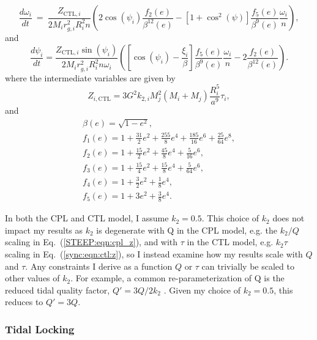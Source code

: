\begin{equation}\label{sync:eqn:ctl:omega}
  \frac{d\omega_i}{dt} \ = \ \frac{Z_{\mathrm{CTL},i}}{2 M_i r_{g,i}^2 
R_i^2 n} \left( 2 \cos(\psi_i) \frac{f_2(e)}{\beta^{12}(e)} - \left[ 1+\cos^2(\psi)
 \right] \frac{f_5(e)}{\beta^9(e)} 
\frac{\omega_i}{n} \right),  
\end{equation}
and
\begin{equation}\label{sync:eqn:ctl:psi}
  \frac{d\psi_i}{dt} = \frac{Z_{\mathrm{CTL},i} \sin(\psi_i)}{2 M_i r_{g,i}^2 R_i^2 n \omega_i}\left( \left[ \cos(\psi_i) - \frac{\xi_i}{ \beta} \right] \frac{f_5(e)}{\beta^9(e)} \frac{\omega_i}{n} - 2 \frac{f_2(e)}{\beta^{12}(e)} \right).
\end{equation}
\normalsize
where the intermediate variables are given by 
\begin{equation}\label{sync:eqn:ctl:z}
 Z_{i,\mathrm{CTL}} = 3 G^2 k_{2,i} M_j^2 (M_i+M_j) \frac{R_i^5}{a^9} \tau_i ,
\end{equation}
and 
\begin{equation}\label{sync:eqn:ctl:f_e}
\begin{array}{l}
\beta(e) = \sqrt{1-e^2},\\
f_1(e) = 1 + \frac{31}{2} e^2 + \frac{255}{8} e^4 + \frac{185}{16} e^6 + \frac{25}{
64} e^8,\\
f_2(e) = 1 + \frac{15}{2} e^2 + \frac{45}{8} e^4 + \frac{5}{16} e^6,\\
f_3(e) = 1 + \frac{15}{4} e^2 + \frac{15}{8} e^4 + \frac{5}{64} e^6,\\
f_4(e) = 1 + \frac{3}{2} e^2 + \frac{1}{8} e^4,\\
f_5(e) = 1 + 3 e^2 + \frac{3}{8} e^4.
\end{array}
\end{equation}

In both the CPL and CTL model, I assume $k_2 = 0.5$. This choice of $k_2$ does not impact my results as $k_2$ is degenerate with Q in the CPL model, e.g. the $k_2/Q$ scaling in Eq.~(\ref{STEEP:eqn:cpl_z}), and with $\tau$ in the CTL model, e.g. $k_2 \tau$ scaling in Eq.~(\ref{sync:eqn:ctl:z}), so I instead examine how my results scale with $Q$ and $\tau$.  Any constraints I derive as a function $Q$ or $\tau$ can trivially be scaled to other values of $k_2$. For example, a common re-parameterization of Q is the reduced tidal quality factor, $Q' = 3Q/2k_2$ \citep[e.g.][]{Leconte2010}. Given my choice of $k_2 = 0.5$, this reduces to $Q' = 3 Q$.

\subsubsection{Tidal Locking}

